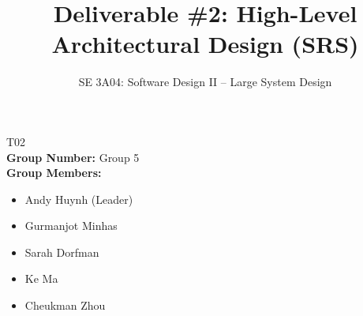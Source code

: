\documentclass[]{article}
\title{Deliverable \#2: High-Level Architectural Design (\textbf{SRS})}
\author{SE 3A04: Software Design II -- Large System Design}
\date{}
\begin{document}
\maketitle	
{} T02\\
{\bf Group Number:} Group 5 \\
{\bf Group Members:} 
\begin{itemize}
	\item Andy Huynh (Leader)
	\item Gurmanjot Minhas
	\item Sarah Dorfman
	\item Ke Ma
	\item Cheukman Zhou
\end{itemize}

\newpage

% 


% 


% 


% 


% 

% 



\end{document}
